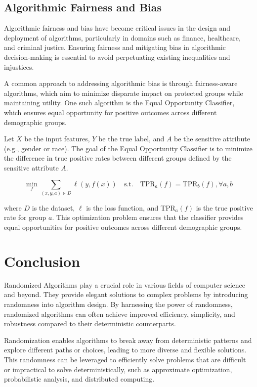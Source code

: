 \documentclass[12pt]{book} %
\begin{document}
\subsection{Algorithmic Fairness and Bias}

Algorithmic fairness and bias have become critical issues in the design and deployment of algorithms, particularly in domains such as finance, healthcare, and criminal justice. Ensuring fairness and mitigating bias in algorithmic decision-making is essential to avoid perpetuating existing inequalities and injustices.

A common approach to addressing algorithmic bias is through fairness-aware algorithms, which aim to minimize disparate impact on protected groups while maintaining utility. One such algorithm is the Equal Opportunity Classifier, which ensures equal opportunity for positive outcomes across different demographic groups.

Let \(X\) be the input features, \(Y\) be the true label, and \(A\) be the sensitive attribute (e.g., gender or race). The goal of the Equal Opportunity Classifier is to minimize the difference in true positive rates between different groups defined by the sensitive attribute \(A\).

\[
\min_{f} \sum_{(x,y,a) \in D} \ell(y, f(x)) \quad \text{s.t.} \quad \text{TPR}_a(f) = \text{TPR}_b(f), \forall a, b
\]

where \(D\) is the dataset, \(\ell\) is the loss function, and \(\text{TPR}_a(f)\) is the true positive rate for group \(a\). This optimization problem ensures that the classifier provides equal opportunities for positive outcomes across different demographic groups.


\section{Conclusion}

Randomized Algorithms play a crucial role in various fields of computer science and beyond. They provide elegant solutions to complex problems by introducing randomness into algorithm design. By harnessing the power of randomness, randomized algorithms can often achieve improved efficiency, simplicity, and robustness compared to their deterministic counterparts.

Randomization enables algorithms to break away from deterministic patterns and explore different paths or choices, leading to more diverse and flexible solutions. This randomness can be leveraged to efficiently solve problems that are difficult or impractical to solve deterministically, such as approximate optimization, probabilistic analysis, and distributed computing.
\end{document}
